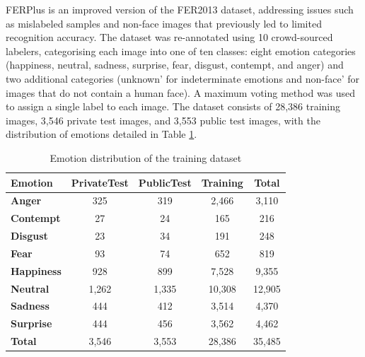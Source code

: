 FERPlus is an improved version of the FER2013 dataset, addressing issues such as mislabeled samples and non-face images that previously led to limited recognition accuracy. The dataset was re-annotated using 10 crowd-sourced labelers, categorising each image into one of ten classes: eight emotion categories (happiness, neutral, sadness, surprise, fear, disgust, contempt, and anger) and two additional categories (unknown' for indeterminate emotions and non-face' for images that do not contain a human face). A maximum voting method was used to assign a single label to each image. The dataset consists of 28,386 training images, 3,546 private test images, and 3,553 public test images, with the distribution of emotions detailed in Table \ref{tab:emotion_distribution}.

\begin{table}[!htb]
\centering{}
\caption{Emotion distribution of the training dataset}
\begin{tabular}{|l|c|c|c|c|}
\hline
    \textbf{Emotion}   & \textbf{PrivateTest} & \textbf{PublicTest} & \textbf{Training} & \textbf{Total} \\ \hline
    \textbf{Anger}     & 325                  & 319                 & 2,466             & 3,110          \\ \hline
    \textbf{Contempt}  & 27                   & 24                  & 165               & 216            \\ \hline
    \textbf{Disgust}   & 23                   & 34                  & 191               & 248            \\ \hline
    \textbf{Fear}      & 93                   & 74                  & 652               & 819            \\ \hline
    \textbf{Happiness} & 928                  & 899                 & 7,528             & 9,355          \\ \hline
    \textbf{Neutral}   & 1,262                & 1,335               & 10,308            & 12,905         \\ \hline
    \textbf{Sadness}   & 444                  & 412                 & 3,514             & 4,370          \\ \hline
    \textbf{Surprise}  & 444                  & 456                 & 3,562             & 4,462          \\ \hline
    \textbf{Total}     & 3,546                & 3,553               & 28,386            & 35,485         \\ \hline
\end{tabular}
\label{tab:emotion_distribution}
\end{table}

